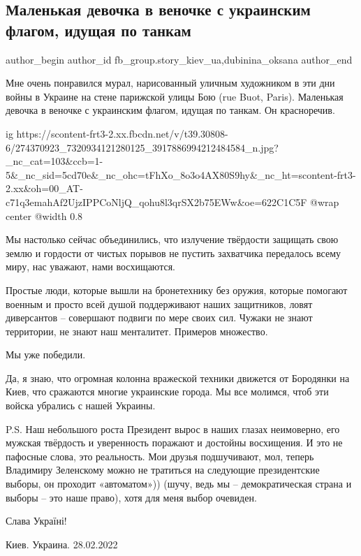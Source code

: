  
 
 
 
 
 
\subsection{Маленькая девочка в веночке с украинским флагом, идущая по танкам}
\label{sec:28_02_2022.fb.fb_group.story_kiev_ua.3.mural}
 
\ifcmt
 author_begin
   author_id fb_group.story_kiev_ua,dubinina_oksana
 author_end
\fi

Мне очень понравился мурал, нарисованный уличным художником  в эти дни войны в
Украине на стене парижской улицы Бою (rue Buot, Paris). Маленькая девочка в
веночке с украинским флагом, идущая по танкам. Он красноречив. 

\ifcmt
  ig https://scontent-frt3-2.xx.fbcdn.net/v/t39.30808-6/274370923_7320934121280125_3917886994212484584_n.jpg?_nc_cat=103&ccb=1-5&_nc_sid=5cd70e&_nc_ohc=tFhXo_8o3o4AX80S9hy&_nc_ht=scontent-frt3-2.xx&oh=00_AT-c71q3emahAf2UjzIPPCoNljQ_qohu8l3qrSX2b75EWw&oe=622C1C5F
  @wrap center
  @width 0.8
\fi

Мы настолько сейчас объединились, что излучение твёрдости защищать свою землю и
гордости от чистых порывов не пустить захватчика передалось всему  миру, нас
уважают, нами восхищаются.

Простые люди, которые вышли на бронетехнику без оружия, которые помогают
военным и просто всей душой поддерживают наших защитников, ловят диверсантов  –
совершают подвиги по мере своих сил. Чужаки не знают территории, не знают наш
менталитет.  Примеров множество.

Мы уже победили. 

Да, я знаю, что огромная колонна вражеской техники движется от Бородянки на
Киев, что сражаются многие украинские города. Мы все молимся, чтоб эти войска
убрались с нашей Украины. 

P.S. Наш небольшого роста Президент вырос в наших глазах неимоверно, его
мужская твёрдость и уверенность поражают и достойны восхищения. И это не
пафосные слова, это реальность. Мои друзья подшучивают, мол, теперь Владимиру
Зеленскому можно не тратиться на следующие президентские выборы, он проходит
«автоматом»)) (шучу, ведь мы – демократическая страна и выборы – это наше
право), хотя для меня выбор очевиден.

Слава Україні!

Киев. Украина. 28.02.2022

